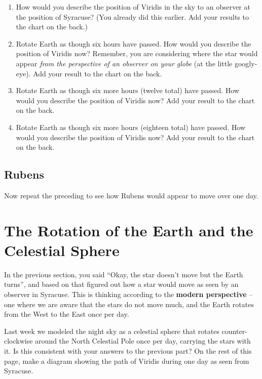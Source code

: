 \documentclass[12pt]{article}
\begin{document}
\begin{enumerate}

\item How would you describe the position of Viridis in the sky to an observer at the position of Syracuse? (You already did this earlier. Add your results to the chart on the back.)

\item Rotate Earth as though six hours have passed. How would you describe the position of Viridis now? Remember, you are considering where the star would appear {\it from the perspective of an observer on your globe} (at the little googly-eye). Add your result to the chart on the back.
\item Rotate Earth as though six more hours (twelve total) have passed. How would you describe the position of Viridis now? Add your result to the chart on the back.
\item Rotate Earth as though six more hours (eighteen total)  have passed. How would you describe the position of Viridis now? Add your result to the chart on the back.
\vspace{1in}

\end{enumerate}

\subsection{Rubens}

Now repeat the preceding to see how Rubens would appear to move over one day.

\section{The Rotation of the Earth and the Celestial Sphere}

In the previous section, you said ``Okay, the star doesn't move but the Earth turns'', and based on that 
figured out how a star would move as seen by an observer in Syracuse. This is thinking according to the {\bf modern perspective}
-- one where we are aware that the stars do not move much, and the Earth rotates from the West to the East once per day.

Last week we modeled the night sky as a celestial sphere that rotates counter-clockwise around the North Celestial Pole once per day, carrying
the stars with it. Is this consistent with your answers to the previous part? On the rest of this page, make a diagram showing the path of Viridis during one day as seen from Syracuse.
\end{document}
